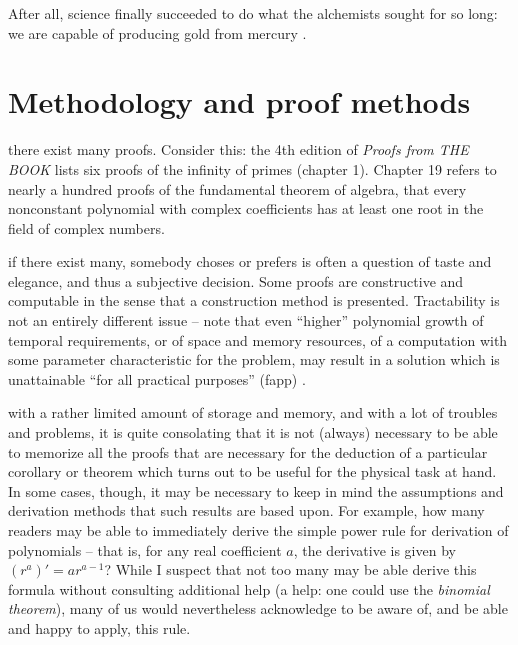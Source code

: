 After all, science finally succeeded to do what the alchemists sought for so long:
we are capable of producing gold from mercury \cite{PhysRev.60.473}.

\begin{center}
{\color{lightgray}   \Huge
\aldine
}
\end{center}


\chapter{Methodology and proof methods}
\label{ch:mpm}

 there exist many proofs.
Consider this: the 4th edition of {\em Proofs from THE BOOK}  \cite{ziegler-aigner}
lists six proofs
of the infinity of primes (chapter 1).
Chapter 19 refers to nearly a hundred proofs of the fundamental theorem
of algebra, that every nonconstant polynomial with complex coefficients has at least
one root in the field of complex numbers.

 if there exist many, somebody choses or prefers is often a question of taste and elegance, and thus a subjective decision.
Some proofs are constructive \cite{bridges-richman,bishop} and   computable \cite{aberth-80,Weihrauch,BHW08}
in the sense that a construction method is presented.
Tractability is not an entirely different issue \cite{kreisel,gandy2,pit:90}
--
note that even ``higher'' polynomial growth of temporal requirements, or of space and memory resources,
of a computation with some parameter characteristic for the problem,
may result in a solution which is unattainable ``for all practical purposes'' (fapp) \cite{bell-a}.

 with a rather limited amount of storage and memory,
and with a lot of troubles and problems, it is quite consolating that
it is not (always) necessary to be able to memorize all the proofs that are necessary for the deduction
of a particular
corollary or theorem which turns out to be useful for the physical task at hand.
In some cases, though, it may be necessary to keep in mind the assumptions and derivation
methods that such results are based upon.
For example, how many readers may be able to immediately derive
the simple power rule
for derivation of polynomials -- that is,  for any real coefficient $a$, the derivative is given by
$(r^a)' =a r^{a-1}$?
While I suspect that not too many may be able derive this formula without consulting additional help
(a help: one could use the {\em binomial theorem}),
many of us would nevertheless acknowledge to be aware of, and be able and happy to apply, this rule.

